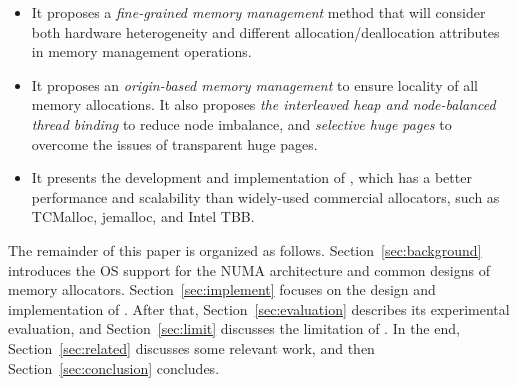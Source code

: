 \begin{itemize}

\item It proposes a \textit{fine-grained memory management} method that will consider both hardware heterogeneity and different allocation/deallocation attributes in memory management operations.

\item It proposes an \textit{origin-based memory management} to ensure locality of all memory allocations. It also proposes \textit{the interleaved heap and node-balanced thread binding} to reduce node imbalance, and \textit{selective huge pages} to overcome the issues of transparent huge pages. 

\item It presents the development and implementation of \NM{}, which has a better performance and scalability than widely-used commercial allocators, such as TCMalloc, jemalloc, and Intel TBB. 

\end{itemize}

The remainder of this paper is organized as follows. Section~\ref{sec:background} introduces the OS support for the NUMA architecture and common designs of memory allocators. Section~\ref{sec:implement} focuses on the design and implementation of \NM{}. After that, Section~\ref{sec:evaluation} describes its experimental evaluation, and Section~\ref{sec:limit} discusses the limitation of \NM{}. In the end, Section~\ref{sec:related} discusses some relevant work, and then Section~\ref{sec:conclusion} concludes. 